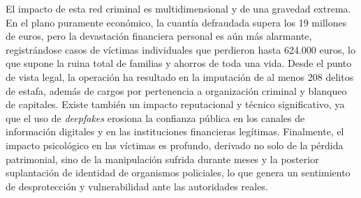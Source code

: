     El impacto de esta red criminal es multidimensional y de una gravedad extrema. 
    En el plano puramente económico, la cuantía defraudada supera los 19 millones de euros, 
    pero la devastación financiera personal es aún más alarmante, registrándose casos de 
    víctimas individuales que perdieron hasta 624.000 euros, lo que supone la ruina total 
    de familias y ahorros de toda una vida. Desde el punto de vista legal, la operación ha 
    resultado en la imputación de al menos 208 delitos de estafa, además de cargos por 
    pertenencia a organización criminal y blanqueo de capitales. Existe también un impacto 
    reputacional y técnico significativo, ya que el uso de \textit{deepfakes} erosiona la 
    confianza pública en los canales de información digitales y en las instituciones 
    financieras legítimas. Finalmente, el impacto psicológico en las víctimas es profundo, 
    derivado no solo de la pérdida patrimonial, sino de la manipulación sufrida durante 
    meses y la posterior suplantación de identidad de organismos policiales, 
    lo que genera un sentimiento de desprotección y vulnerabilidad ante las autoridades 
    reales.

 